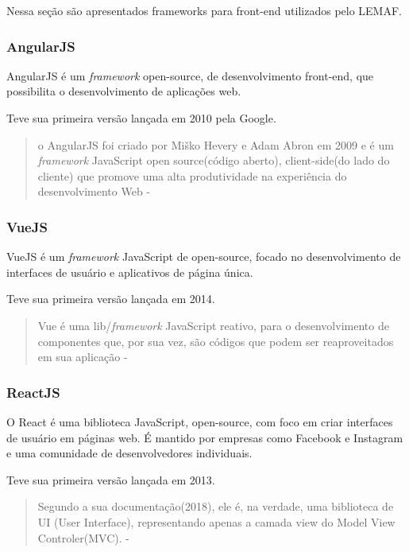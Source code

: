 Nessa seção são apresentados frameworks para front-end utilizados pelo LEMAF.

\subsubsection{AngularJS}

AngularJS é um \textit{framework} open-source, de desenvolvimento front-end, que possibilita o desenvolvimento de aplicações web.

Teve sua primeira versão lançada em 2010 pela Google.

\begin{quote}
  o AngularJS foi criado por Miško Hevery e Adam Abron  em  2009  e  é  um  \textit{framework}  JavaScript open  source(código  aberto), client-side(do lado  do  cliente)  que  promove  uma  alta  produtividade  na  experiência  do  desenvolvimento Web - \cite{ferreira2018analise}
\end{quote}


\subsubsection{VueJS}

VueJS é um \textit{framework} JavaScript de open-source, focado no desenvolvimento de interfaces de usuário e aplicativos de página única.

Teve sua primeira versão lançada em 2014.

\begin{quote}
  Vue é uma lib/\textit{framework} JavaScript reativo, para  o  desenvolvimento  de  componentes  que,  por  sua  vez,  são  códigos  que  podem  ser reaproveitados em sua aplicação - \cite{ferreira2018analise}
\end{quote}


\subsubsection{ReactJS}

O React é uma biblioteca JavaScript, open-source, com foco em criar interfaces de usuário em páginas web. É mantido por empresas como Facebook e Instagram e uma comunidade de desenvolvedores individuais. 

Teve sua primeira versão lançada em 2013.

\begin{quote}
  Segundo a sua documentação(2018), ele é, na  verdade,  uma  biblioteca  de  UI  (User  Interface),  representando  apenas  a  camada view do Model  View  Controler(MVC).  - \cite{ferreira2018analise}
\end{quote}


